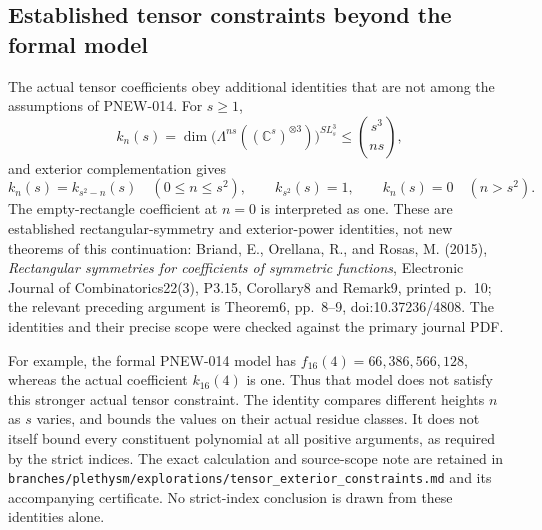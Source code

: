 \subsection*{Established tensor constraints beyond the formal model}
The actual tensor coefficients obey additional identities that are
not among the assumptions of PNEW-014. For $s\ge1$,
\[
 k_n(s)=\dim\bigl(\Lambda^{ns}((\mathbb C^s)^{\otimes3})
                         \bigr)^{SL_s^3}
       \le {s^3\choose ns},
\]
and exterior complementation gives
\[
 k_n(s)=k_{s^2-n}(s)\quad(0\le n\le s^2),\qquad
 k_{s^2}(s)=1,\qquad k_n(s)=0\quad(n>s^2).
\]
The empty-rectangle coefficient at $n=0$ is interpreted as one.
These are established rectangular-symmetry and exterior-power
identities, not new theorems of this continuation: Briand, E.,
Orellana, R., and Rosas, M. (2015), \emph{Rectangular symmetries for
coefficients of symmetric functions}, Electronic Journal of
Combinatorics22(3), P3.15, Corollary8 and Remark9, printed p.~10;
the relevant preceding argument is Theorem6, pp.~8--9,
doi:10.37236/4808. The identities and their precise scope were checked
against the primary journal PDF.

For example, the formal PNEW-014 model has
$f_{16}(4)=66{,}386{,}566{,}128$, whereas the actual coefficient
$k_{16}(4)$ is one. Thus that model does not satisfy this stronger
actual tensor constraint. The identity compares different heights
$n$ as $s$ varies, and bounds the values on their actual residue
classes. It does not itself bound every constituent polynomial at
all positive arguments, as required by the strict indices. The
exact calculation and source-scope note are retained in
\nolinkurl{branches/plethysm/explorations/tensor_exterior_constraints.md}
and its accompanying certificate. No strict-index conclusion is
drawn from these identities alone.
